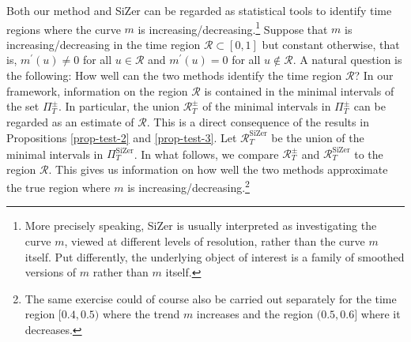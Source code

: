 Both our method and SiZer can be regarded as statistical tools to identify time regions where the curve $m$ is increasing/decreasing.\footnote{More precisely speaking, SiZer is usually interpreted as investigating the curve $m$, viewed at different levels of resolution, rather than the curve $m$ itself. Put differently, the underlying object of interest is a family of smoothed versions of $m$ rather than $m$ itself.} Suppose that $m$ is increasing/decreasing in the time region $\mathcal{R} \subset [0,1]$ but constant otherwise, that is, $m^\prime(u) \ne 0$ for all $u \in \mathcal{R}$ and $m^\prime(u) = 0$ for all $u \notin \mathcal{R}$. A natural question is the following: How well can the two methods identify the time region $\mathcal{R}$? In our framework, information on the region $\mathcal{R}$ is contained in the minimal intervals of the set $\Pi_T^\pm$. In particular, the union $\mathcal{R}_T^\pm$ of the minimal intervals in $\Pi_T^\pm$ can be regarded as an estimate of $\mathcal{R}$. This is a direct consequence of the results in Propositions \ref{prop-test-2} and \ref{prop-test-3}. Let $\mathcal{R}_T^{\text{SiZer}}$ be the union of the minimal intervals in $\Pi_T^{\text{SiZer}}$. In what follows, we compare $\mathcal{R}_T^\pm$ and $\mathcal{R}_T^{\text{SiZer}}$ to the region $\mathcal{R}$. This gives us information on how well the two methods approximate the true region where $m$ is increasing/decreasing.\footnote{The same exercise could of course also be carried out separately for the time region $[0.4,0.5)$ where the trend $m$ increases and the region $(0.5,0.6]$ where it decreases.} 


